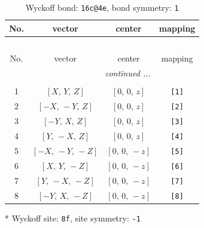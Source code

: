 \documentclass[fleqn,8pt]{jsarticle}
\begin{document}
\begin{longtable}{cccc}
\caption{Wyckoff bond: {\tt 16c@4e}, bond symmetry: {\tt 1}}
 \\
 \hline \hline
No. & vector & center & mapping \\ \hline \endfirsthead

\multicolumn{3}{l}{\tablename\ \thetable{}} \\
 \hline \hline
No. & vector & center & mapping \\ \hline \endhead

 \hline \hline
\multicolumn{3}{r}{\footnotesize\it continued ...} \\ \endfoot

 \hline \hline
\multicolumn{3}{r}{} \\ \endlastfoot

1 & $\left[ X,\, Y,\, Z \right]$ & $\left[ 0,\, 0,\, z \right]$ & {\tt [1]} \\ \hline
2 & $\left[ - X,\, - Y,\, Z \right]$ & $\left[ 0,\, 0,\, z \right]$ & {\tt [2]} \\ \hline
3 & $\left[ - Y,\, X,\, Z \right]$ & $\left[ 0,\, 0,\, z \right]$ & {\tt [3]} \\ \hline
4 & $\left[ Y,\, - X,\, Z \right]$ & $\left[ 0,\, 0,\, z \right]$ & {\tt [4]} \\ \hline
5 & $\left[ - X,\, - Y,\, - Z \right]$ & $\left[ 0,\, 0,\, - z \right]$ & {\tt [5]} \\ \hline
6 & $\left[ X,\, Y,\, - Z \right]$ & $\left[ 0,\, 0,\, - z \right]$ & {\tt [6]} \\ \hline
7 & $\left[ Y,\, - X,\, - Z \right]$ & $\left[ 0,\, 0,\, - z \right]$ & {\tt [7]} \\ \hline
8 & $\left[ - Y,\, X,\, - Z \right]$ & $\left[ 0,\, 0,\, - z \right]$ & {\tt [8]} \\
\end{longtable}
* Wyckoff site: {\tt 8f}, site symmetry: {\tt -1}
\renewcommand{\arraystretch}{1.2}
\end{document}

